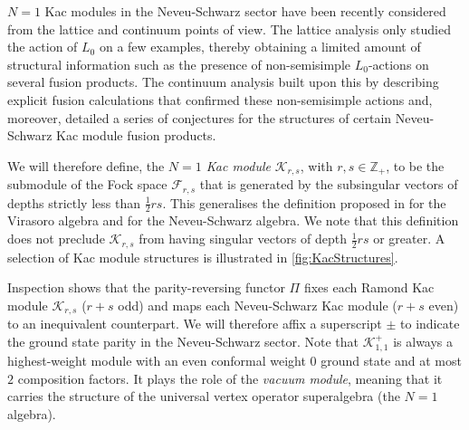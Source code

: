 \documentclass[a4paper,reqno,12pt]{report}
\theoremstyle{definition}
\numberwithin{equation}{section}
\newcommand{\ZZ}{\mathbb{Z}}
\newcommand{\Kac}[1]{\mathcal{K}_{#1}}       %
\newcommand{\Fock}[1]{\mathcal{F}_{#1}}      %
\newcommand{\hw}{highest-weight}
\newcommand{\svs}{singular vectors}
\newcommand{\ssvs}{subsingular vectors}
\newcommand{\hwm}{\hw{} module}
\newcommand{\ns}{Neveu-Schwarz}
\theoremstyle{plain}
\begin{document}
$N=1$ Kac modules in the \ns{} sector have been recently considered from the lattice \cite{PeaLog14} and continuum \cite{CanFusI15} points of view.  The lattice analysis only studied the action of $L_0$ on a few examples, thereby obtaining a limited amount of structural information such as the presence of non-semisimple $L_0$-actions on several fusion products.  The continuum analysis built upon this by describing explicit fusion calculations that confirmed these non-semisimple actions and, moreover, detailed a series of conjectures for the structures of certain \ns{} Kac module fusion products.  

We will therefore define, the \emph{$N=1$ Kac module} $\Kac{r,s}$, with $r,s \in \ZZ_+$, to be the submodule of the Fock space $\Fock{r,s}$ that is generated by the \ssvs{} of depths strictly less than $\frac{1}{2} rs$.  This generalises the definition proposed in \cite{MorKac15} for the Virasoro algebra and \cite{CanFusI15} for the \ns{} algebra.  We note that this definition does not preclude $\Kac{r,s}$ from having \svs{} of depth $\frac{1}{2} rs$ or greater.  A selection of Kac module structures is illustrated in \cref{fig:KacStructures}.

Inspection shows that the parity-reversing functor $\Pi$ fixes each Ramond Kac module $\Kac{r,s}$ ($r+s$ odd) and maps each \ns{} Kac module ($r+s$ even) to an inequivalent counterpart.  We will therefore affix a superscript $\pm$ to indicate the ground state parity in the \ns{} sector.  Note that $\Kac{1,1}^+$ is always a \hwm{} with an even conformal weight $0$ ground state and at most $2$ composition factors.  It plays the role of the \emph{vacuum module}, meaning that it carries the structure of the universal vertex operator superalgebra (the $N=1$ algebra).
\end{document}
